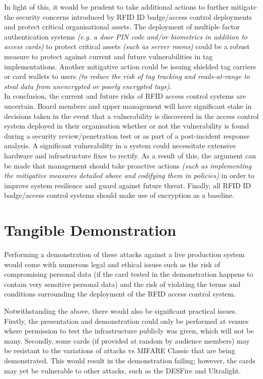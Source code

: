 \noindent In light of this, it would be prudent to take additional actions to further mitigate the security concerns introduced by RFID ID badge/access control deployments and protect critical organisational assets. The deployment of multiple factor authentication systems \textit{(e.g. a door PIN code and/or biometrics in addition to access cards)} to protect critical assets \textit{(such as server rooms)} could be a robust measure to protect against current and future vulnerabilities in tag implementations. Another mitigative action could be issuing shielded tag carriers or card wallets to users \textit{(to reduce the risk of tag tracking and reads-at-range to steal data from unencrypted or poorly encrypted tags)}.\\

\noindent In conclusion, the current and future risks of RFID access control systems are uncertain. Board members and upper management will have significant stake in decisions taken in the event that a vulnerability is discovered in the access control system deployed in their organisation whether or not the vulnerability is found during a security review/penetration test or as part of a post-incident response analysis. A significant vulnerability in a system could necessitate extensive hardware and infrastructure fixes to rectify. As a result of this, the argument can be made that management should take proactive actions \textit{(such as implementing the mitigative measures detailed above and codifying them in policies)} in order to improve system resilience and guard against future threat. Finally, all RFID ID badge/access control systems should make use of encryption as a baseline.

\section{Tangible Demonstration}
Performing a demonstration of these attacks against a live production system would come with numerous legal and ethical issues such as the risk of compromising personal data (if the card tested in the demonstration happens to contain very sensitive personal data) and the risk of violating the terms and conditions surrounding the deployment of the RFID access control system.

Notwithstanding the above, there would also be significant practical issues.
Firstly, the presentation and demonstration could only be performed at venues where permission to test the infrastructure publicly was given, which will not be many. Secondly, some cards (if provided at random by audience members) may be resistant to the variations of attacks vs MIFARE Classic that are being demonstrated. This would result in the demonstration failing; however, the cards may yet be vulnerable to other attacks, such as the DESFire and Ultralight.


